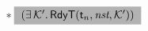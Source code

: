 \begin{figure}[!t]
\[\begin{array}{lll}
{\begin{array}{l}
{                        } 
                        \sepstar
                        \colorbox{gray!60}
                        {
                            $(\exists \, \hthrdlocalst'. \, 
                                \RelRdyT{\thrdid_n}{\nst}{\hthrdlocalst'})$
                        }  

\end{array}}
\end{array}\]
\end{figure}
